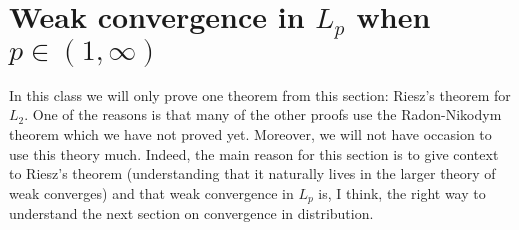 \clearpage
%
%
\section{Weak convergence in $L_p$ when $p\in (1,\infty)$}

In this class we will only prove one theorem from this section:  Riesz's theorem for $L_2$. One of the reasons is that many of the other proofs use the Radon-Nikodym theorem which we have not proved yet. Moreover, we will not have occasion to use this theory much. Indeed, the main reason for this section is to give context to Riesz's theorem (understanding that it naturally lives in the larger theory of weak converges) and that weak convergence in $L_p$ is, I think, the right way to understand the next section on convergence in distribution. 

